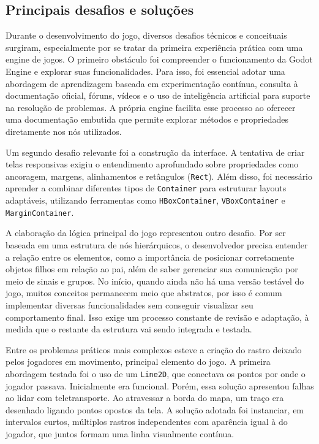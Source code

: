 \subsection{Principais desafios e soluções}

Durante o desenvolvimento do jogo, diversos desafios técnicos e conceituais surgiram, especialmente por se tratar da primeira experiência prática com uma engine de jogos. O primeiro obstáculo foi compreender o funcionamento da Godot Engine e explorar suas funcionalidades. Para isso, foi essencial adotar uma abordagem de aprendizagem baseada em experimentação contínua, consulta à documentação oficial, fóruns, vídeos e o uso de inteligência artificial para suporte na resolução de problemas. A própria engine facilita esse processo ao oferecer uma documentação embutida que permite explorar métodos e propriedades diretamente nos nós utilizados.

Um segundo desafio relevante foi a construção da interface. A tentativa de criar telas responsivas exigiu o entendimento aprofundado sobre propriedades como ancoragem, margens, alinhamentos e retângulos (\texttt{Rect}). Além disso, foi necessário aprender a combinar diferentes tipos de \texttt{Container} para estruturar layouts adaptáveis, utilizando ferramentas como \texttt{HBoxContainer}, \texttt{VBoxContainer} e \texttt{MarginContainer}.

A elaboração da lógica principal do jogo representou outro desafio. Por ser baseada em uma estrutura de nós hierárquicos, o desenvolvedor precisa entender a relação entre os elementos, como a importância de posicionar corretamente objetos filhos em relação ao pai, além de saber gerenciar sua comunicação por meio de sinais e grupos. No início, quando ainda não há uma versão testável do jogo, muitos conceitos permanecem meio que abstratos, por isso é comum implementar diversas funcionalidades sem conseguir visualizar seu comportamento final. Isso exige um processo constante de revisão e adaptação, à medida que o restante da estrutura vai sendo integrada e testada.

Entre os problemas práticos mais complexos esteve a criação do rastro deixado pelos jogadores em movimento, principal elemento do jogo. A primeira abordagem testada foi o uso de um \texttt{Line2D}, que conectava os pontos por onde o jogador passava. Inicialmente era funcional. Porém, essa solução apresentou falhas ao lidar com teletransporte. Ao atravessar a borda do mapa, um traço era desenhado ligando pontos opostos da tela. A solução adotada foi instanciar, em intervalos curtos, múltiplos rastros independentes com aparência igual à do jogador, que juntos formam uma linha visualmente contínua.

